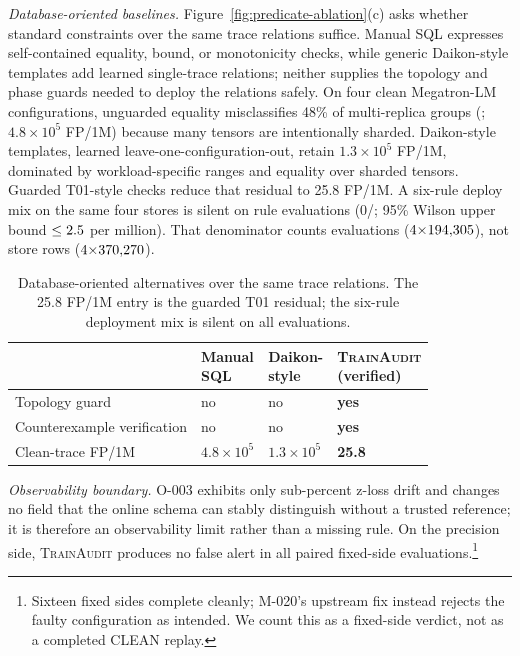 \documentclass[sigconf,nonacm]{acmart}
\begin{document}
\emph{Database-oriented baselines.}
Figure~\ref{fig:predicate-ablation}(c) asks whether standard constraints over the same
trace relations suffice. Manual SQL expresses self-contained equality, bound,
or monotonicity checks, while generic Daikon-style templates add learned
single-trace relations; neither supplies the topology and phase guards needed
to deploy the relations safely. On four clean Megatron-LM configurations,
unguarded equality misclassifies 48\% of multi-replica groups
(\UnguardedFrac{}; $4.8{\times}10^5$ FP/1M) because many tensors are intentionally sharded.
Daikon-style templates, learned leave-one-configuration-out, retain
$1.3{\times}10^5$ FP/1M, dominated by workload-specific ranges and equality
over sharded tensors. Guarded T01-style checks reduce that residual to 25.8 FP/1M.
A six-rule deploy mix on the same four stores is silent on
\CleanEvals{} rule evaluations (0/\CleanEvals{}; 95\% Wilson upper bound
$\le2.5{}$ per million). That denominator counts evaluations
($4{\times}194{,}305{}$), not store rows ($4{\times}370{,}270{}$).

\begin{table}[t]
\centering\footnotesize
{}
\caption{Database-oriented alternatives over the same trace relations. The
25.8 FP/1M entry is the guarded T01 residual; the six-rule deployment mix is
silent on all \CleanEvals{} evaluations.}
\label{tab:db-baselines}
\begin{tabularx}{\linewidth}{@{}l >{\centering\arraybackslash}X >{\centering\arraybackslash}X >{\centering\arraybackslash}X@{}}
\toprule
 & \shortstack{Manual\\SQL} & \shortstack{Daikon-\\style} &
 \shortstack{\textsc{TrainAudit}\\(verified)} \\
\midrule
Topology guard       & no & no & \textbf{yes} \\
Counterexample verification & no & no & \textbf{yes} \\
\midrule
Clean-trace FP/1M & $4.8{\times}10^5$ & $1.3{\times}10^5$ & \textbf{25.8} \\
\bottomrule
\end{tabularx}
\end{table}

\label{para:detection-boundary}
\emph{Observability boundary.}
O-003 exhibits only sub-percent z-loss drift and changes no field that the
online schema can stably distinguish without a trusted reference; it is
therefore an observability limit rather than a missing rule. On the precision
side, \textsc{TrainAudit} produces no false alert in all
\NumFixedReplay{} paired fixed-side evaluations.\footnote{Sixteen fixed sides
complete cleanly; M-020's upstream fix instead rejects the faulty
configuration as intended. We count this as a fixed-side verdict, not as a
completed CLEAN replay.}
\end{document}
